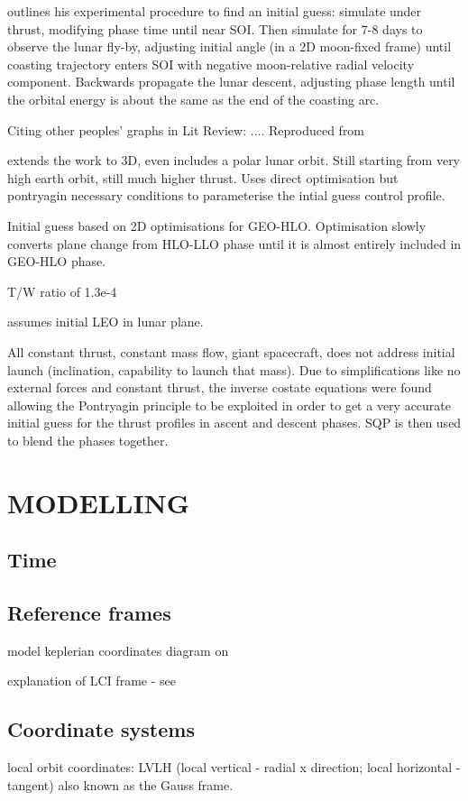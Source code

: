 \textcite{Kluever1996} outlines his experimental procedure to find an initial guess: simulate under thrust, modifying phase time until near SOI. Then simulate for 7-8 days to observe the lunar fly-by, adjusting initial angle (in a 2D moon-fixed frame) until coasting trajectory enters SOI with negative moon-relative radial velocity component. Backwards propagate the lunar descent, adjusting phase length until the orbital energy is about the same as the end of the coasting arc.

Citing other peoples' graphs in Lit Review: .... Reproduced from \cite{}

\textcite{Kluever1997} extends the work to 3D, even includes a polar lunar orbit. Still starting from very high earth orbit, still much higher thrust. Uses direct optimisation but pontryagin necessary conditions to parameterise the intial guess control profile.

Initial guess based on 2D optimisations for GEO-HLO. Optimisation slowly converts plane change from HLO-LLO phase  until it is almost entirely included in GEO-HLO phase.

T/W ratio of 1.3e-4

\textcite{Kluever1995} assumes initial LEO in lunar plane.

All constant thrust, constant mass flow, giant spacecraft, does not address initial launch (inclination, capability to launch that mass). Due to simplifications like no external forces and constant thrust, the inverse costate equations were found allowing the Pontryagin principle to be exploited in order to get a very accurate initial guess for the thrust profiles in ascent and descent phases. SQP is then used to blend the phases together.

\section{MODELLING}
\cite{Newton1687}
\subsection{Time}
\subsection{Reference frames}
model keplerian coordinates diagram on \cite{Pollard2000}

explanation of LCI frame - see \cite{Erb_thesis}

\subsection{Coordinate systems}
local orbit coordinates: LVLH (local vertical - radial x direction; local horizontal - tangent) also known as the Gauss frame. \cite{STK}

